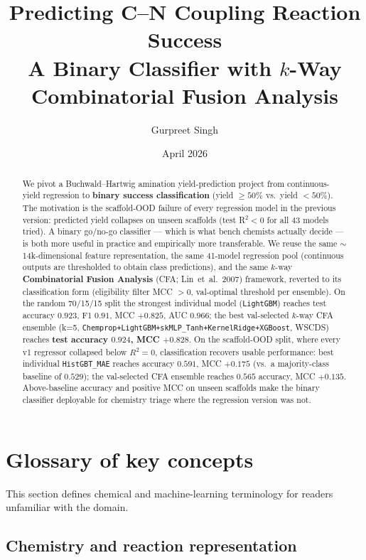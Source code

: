\documentclass[11pt,a4paper]{article}
\title{\textbf{Predicting C--N Coupling Reaction Success}\\[2pt]
       \large A Binary Classifier with $k$-Way Combinatorial Fusion Analysis}
\author{Gurpreet Singh}
\date{April 2026}
\begin{document}
\maketitle

\begin{abstract}
\noindent We pivot a Buchwald--Hartwig amination yield-prediction project from
continuous-yield regression to \textbf{binary success classification} (yield
$\geq 50\%$ vs.\ yield $< 50\%$). The motivation is the scaffold-OOD failure of
every regression model in the previous version: predicted yield collapses on
unseen scaffolds (test R$^2 < 0$ for all 43 models tried). A binary go/no-go
classifier --- which is what bench chemists actually decide --- is both more
useful in practice and empirically more transferable. We reuse the same
$\sim$14k-dimensional feature representation, the same 41-model regression pool
(continuous outputs are thresholded to obtain class predictions), and the same
$k$-way \textbf{Combinatorial Fusion Analysis} (CFA; Lin~et~al.\ 2007) framework,
reverted to its classification form (eligibility filter MCC $> 0$,
val-optimal threshold per ensemble).
On the random 70/15/15 split the strongest individual model (\texttt{LightGBM})
reaches test accuracy $0.923$, F1 $0.91$, MCC $+0.825$, AUC $0.966$; the best
val-selected $k$-way CFA ensemble (k=5,
\texttt{Chemprop+LightGBM+skMLP\_Tanh+KernelRidge+XGBoost}, WSCDS) reaches
\textbf{test accuracy $0.924$, MCC $+0.828$}.
On the scaffold-OOD split, where every v1 regressor collapsed below
$R^2 = 0$, classification recovers usable performance: best individual
\texttt{HistGBT\_MAE} reaches accuracy $0.591$, MCC $+0.175$ (vs.\ a
majority-class baseline of $0.529$); the val-selected CFA ensemble reaches
$0.565$ accuracy, MCC $+0.135$. Above-baseline accuracy and positive MCC
on unseen scaffolds make the binary classifier deployable for chemistry
triage where the regression version was not.
\end{abstract}

\section{Glossary of key concepts}\label{sec:glossary}

This section defines chemical and machine-learning terminology for readers
unfamiliar with the domain.

\subsection*{Chemistry and reaction representation}
\end{document}
